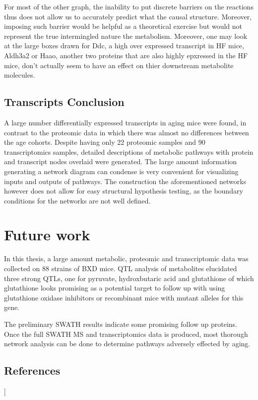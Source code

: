 \documentclass[a4paper]{book}
\begin{document}
	 For most of the other graph, the inability to put discrete barriers on the reactions thus does not allow us to accurately predict what the causal structure. Moreover, imposing such barrier would be helpful as a theoretical exercise but would not represent the true intermingled nature the metabolism. Moreover, one may look at the large boxes drawn for Ddc, a high over expressed transcript in HF mice, Aldh3a2 or Haao, another two proteins that are also highly epxressed in the HF mice, don't actually seem to have an effect on thier downstream metabolite molecules. 
	
	
	\section{Transcripts Conclusion}
	
	A large number differentially expressed transcripts in aging mice were found, in contrast to the proteomic data in which there was almost no differences between the age cohorts. Despite having only 22 proteomic samples and 90 transcriptomics samples, detailed descriptions of metabolic pathways with protein and transcript nodes overlaid were generated. The large amount information generating a network diagram can condense is very convenient for visualizing inputs and outputs of pathways. The construction the aforementioned networks however does not allow for easy structural hypothesis testing, as the boundary conditions for the networks are not well defined.
	
	\chapter{Future work}
	
	In this thesis, a large amount metabolic, proteomic and transcriptomic data was collected on 88 strains of BXD mice. QTL analysis of metabolites elucidated three strong QTLs, one for pyruvate, hydroxbutaric acid and glutathione of which glutathione looks promising as a potential target to follow up with using glutathione oxidase inhibitors or recombinant mice with mutant alleles for this gene. 
	
	The preliminary SWATH results indicate some promising follow up proteins. Once the full SWATH MS and transcriptomics data is produced, most thorough network analysis can be done to determine pathways adversely effected by aging. 

\clearpage
\section{References}]
	{}
	
	
\end{document}
